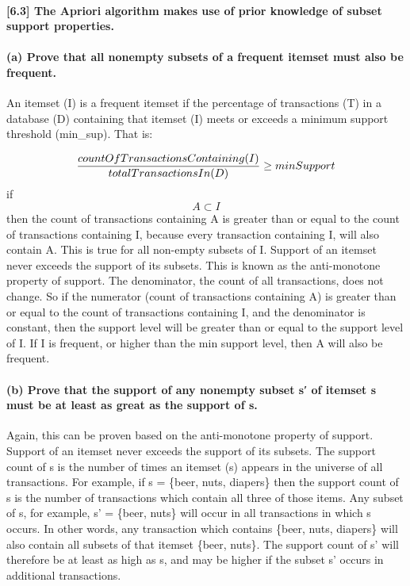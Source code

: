 \documentclass[11pt]{article}
\begin{document}
    \paragraph{{[}6.3{]} The Apriori algorithm makes use of prior knowledge
of subset support
properties.}\label{the-apriori-algorithm-makes-use-of-prior-knowledge-of-subset-support-properties.}

    \paragraph{(a) Prove that all nonempty subsets of a frequent itemset
must also be
frequent.}\label{a-prove-that-all-nonempty-subsets-of-a-frequent-itemset-must-also-be-frequent.}

    An itemset (I) is a frequent itemset if the percentage of transactions
(T) in a database (D) containing that itemset (I) meets or exceeds a
minimum support threshold (min\_sup). That is:

\[ \frac{countOfTransactionsContaining(I)}{totalTransactionsIn(D)} \geq minSupport \\\]if
\[ A \subset I
\] then the count of transactions containing A is greater than or equal
to the count of transactions containing I, because every transaction
containing I, will also contain A. This is true for all non-empty
subsets of I. Support of an itemset never exceeds the support of its
subsets. This is known as the anti-monotone property of support. The
denominator, the count of all transactions, does not change. So if the
numerator (count of transactions containing A) is greater than or equal
to the count of transactions containing I, and the denominator is
constant, then the support level will be greater than or equal to the
support level of I. If I is frequent, or higher than the min support
level, then A will also be frequent.

    \paragraph{(b) Prove that the support of any nonempty subset s′ of
itemset s must be at least as great as the support of
s.}\label{b-prove-that-the-support-of-any-nonempty-subset-s-of-itemset-s-must-be-at-least-as-great-as-the-support-of-s.}

    Again, this can be proven based on the anti-monotone property of
support. Support of an itemset never exceeds the support of its subsets.
The support count of s is the number of times an itemset (s) appears in
the universe of all transactions. For example, if s = \{beer, nuts,
diapers\} then the support count of s is the number of transactions
which contain all three of those items. Any subset of s, for example, s'
= \{beer, nuts\} will occur in all transactions in which s occurs. In
other words, any transaction which contains \{beer, nuts, diapers\} will
also contain all subsets of that itemset \{beer, nuts\}. The support
count of s' will therefore be at least as high as s, and may be higher
if the subset s' occurs in additional transactions.
\end{document}
